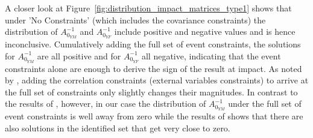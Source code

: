 \documentclass[a4paper,11pt,listof=nochaptergap,oneside,pointednumbers,bibtotoc,bigheadings,liststotoc,hidelinks]{scrbook}
\theoremstyle{mysatz}
\theoremstyle{mydefinition}
\theoremstyle{mytheorem}
\theoremstyle{mybemerkung}
\begin{document}
A closer look at Figure~\ref{fig:distribution_impact_matrices_type1} shows that under 'No Constraints' (which includes the covariance constraints) the distribution of $A_{0_{YM}}^{-1}$ and $A_{0_{YF}}^{-1}$ include positive and negative values and is hence inconclusive. Cumulatively adding the full set of event constraints, the solutions for $A_{0_{YM}}^{-1}$ are all positive and for $A_{0_{YF}}^{-1}$ all negative, indicating that the event constraints alone are enough to derive the sign of the result at impact. As noted by \citet{ludvigsonetal:19}, adding the correlation constraints (external variables constraints) to arrive at the full set of constraints only slightly changes their magnitudes. In contrast to the results of \citet{ludvigsonetal:19}, however, in our case the distribution of $A_{0_{YM}}^{-1}$ under the full set of event constraints is well away from zero while the results of \citet{ludvigsonetal:19} shows that there are also solutions in the identified set that get very close to zero.
\end{document}
